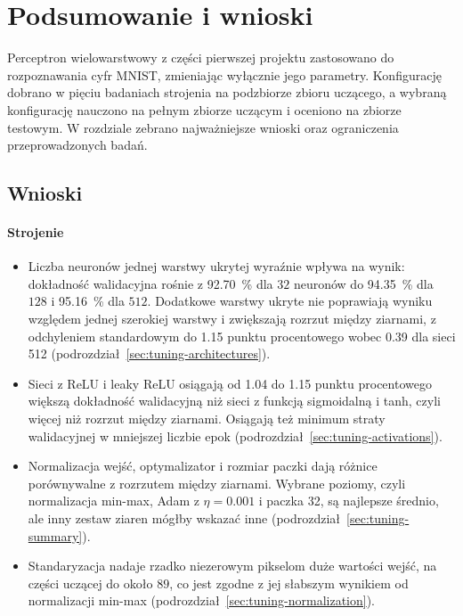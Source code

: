 \section{Podsumowanie i wnioski}
\label{sec:conclusions}

Perceptron wielowarstwowy z części pierwszej projektu zastosowano do rozpoznawania cyfr MNIST, zmieniając wyłącznie jego parametry. Konfigurację dobrano w pięciu badaniach strojenia na podzbiorze zbioru uczącego, a wybraną konfigurację nauczono na pełnym zbiorze uczącym i oceniono na zbiorze testowym. W rozdziale zebrano najważniejsze wnioski oraz ograniczenia przeprowadzonych badań.

\subsection{Wnioski}
\label{sec:conclusions-findings}

\paragraph{Strojenie}
\begin{itemize}
    \item Liczba neuronów jednej warstwy ukrytej wyraźnie wpływa na wynik: dokładność walidacyjna rośnie z \qty{92.70}{\percent} dla $32$ neuronów do \qty{94.35}{\percent} dla $128$ i \qty{95.16}{\percent} dla $512$. Dodatkowe warstwy ukryte nie poprawiają wyniku względem jednej szerokiej warstwy i zwiększają rozrzut między ziarnami, z odchyleniem standardowym do \num{1.15} punktu procentowego wobec \num{0.39} dla sieci 512 (podrozdział~\ref{sec:tuning-architectures}).
    \item Sieci z ReLU i leaky ReLU osiągają od \num{1.04} do \num{1.15} punktu procentowego większą dokładność walidacyjną niż sieci z funkcją sigmoidalną i tanh, czyli więcej niż rozrzut między ziarnami. Osiągają też minimum straty walidacyjnej w mniejszej liczbie epok (podrozdział~\ref{sec:tuning-activations}).
    \item Normalizacja wejść, optymalizator i rozmiar paczki dają różnice porównywalne z rozrzutem między ziarnami. Wybrane poziomy, czyli normalizacja min-max, Adam z $\eta = \num{0.001}$ i paczka 32, są najlepsze średnio, ale inny zestaw ziaren mógłby wskazać inne (podrozdział~\ref{sec:tuning-summary}).
    \item Standaryzacja nadaje rzadko niezerowym pikselom duże wartości wejść, na części uczącej do około $89$, co jest zgodne z jej słabszym wynikiem od normalizacji min-max (podrozdział~\ref{sec:tuning-normalization}).
\end{itemize}

